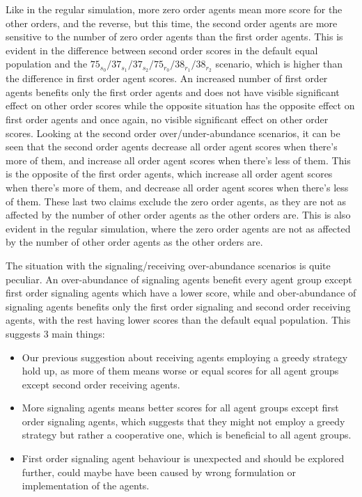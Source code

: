 Like in the regular simulation, more zero order agents mean more score for the other orders, and the reverse, but this time, the second order agents are more sensitive to the number of zero order agents than the first order agents. This is evident in the difference between second order scores in the default equal population and the $75_{s_{0}}/37_{s_{1}}/37_{s_{2}}/75_{r_{0}}/38_{r_{1}}/38_{r_{2}}$ scenario, which is higher than the difference in first order agent scores. An increased number of first order agents benefits only the first order agents and does not have visible significant effect on other order scores while the opposite situation has the opposite effect on first order agents and once again, no visible significant effect on other order scores. Looking at the second order over/under-abundance scenarios, it can be seen that the second order agents decrease all order agent scores when there's more of them, and increase all order agent scores when there's less of them. This is the opposite of the first order agents, which increase all order agent scores when there's more of them, and decrease all order agent scores when there's less of them. These last two claims exclude the zero order agents, as they are not as affected by the number of other order agents as the other orders are. This is also evident in the regular simulation, where the zero order agents are not as affected by the number of other order agents as the other orders are.

The situation with the signaling/receiving over-abundance scenarios is quite peculiar. An over-abundance of signaling agents benefit every agent group except first order signaling agents which have a lower score, while and ober-abundance of signaling agents benefits only the first order signaling and second order receiving agents, with the rest having lower scores than the default equal population. This suggests 3 main things:

\begin{itemize}
    \item Our previous suggestion about receiving agents employing a greedy strategy hold up, as more of them means worse or equal scores for all agent groups except second order receiving agents.
    \item More signaling agents means better scores for all agent groups except first order signaling agents, which suggests that they might not employ a greedy strategy but rather a cooperative one, which is beneficial to all agent groups.
    \item First order signaling agent behaviour is unexpected and should be explored further, could maybe have been caused by wrong formulation or implementation of the agents.
\end{itemize}

